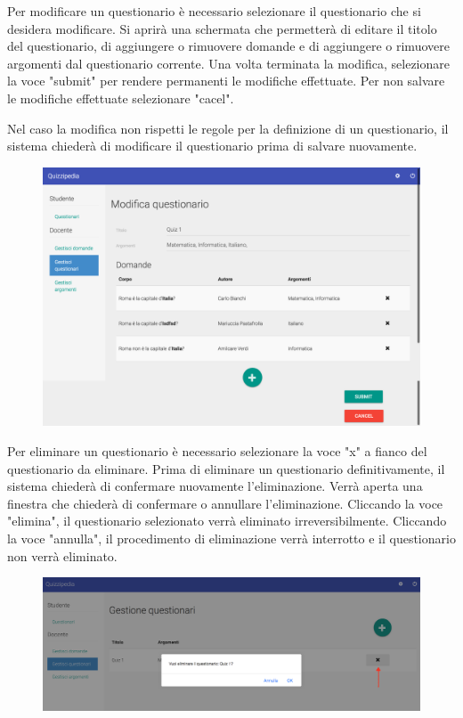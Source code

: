 \documentclass[12pt,a4paper]{article}
\begin{document}
		Per modificare un questionario è necessario selezionare il questionario che si desidera modificare. Si aprirà una schermata che permetterà di editare il titolo del questionario, di aggiungere o rimuovere domande e di aggiungere o rimuovere argomenti dal questionario corrente.
		Una volta terminata la modifica, selezionare la voce "submit" per rendere permanenti le modifiche effettuate. Per non salvare le modifiche effettuate selezionare "cacel".
			
		Nel caso la modifica non rispetti le regole per la definizione di un questionario, il sistema chiederà di modificare il questionario prima di salvare nuovamente.
		
		\begin{figure}[H]	
			\centering
			\includegraphics[width=1.0\linewidth]{../img/screenshot/modificaQuestionario.png}
			\caption{}
			\label{Modifica Questionario}
		\end{figure}
			
		Per eliminare un questionario è necessario selezionare la voce "x" a fianco del questionario da eliminare. Prima di eliminare un questionario definitivamente, il sistema chiederà di confermare nuovamente l'eliminazione.
		Verrà aperta una finestra che chiederà di confermare o annullare l'eliminazione. Cliccando la voce "elimina", il questionario selezionato verrà eliminato irreversibilmente. Cliccando la voce "annulla", il procedimento di eliminazione verrà interrotto e il questionario non verrà eliminato.
		
		\begin{figure}[H]	
			\centering
			\includegraphics[width=0.8\linewidth]{../img/screenshot/eliminaQuestionario.png}
			\caption{}
			\label{Elimina questionario}
		\end{figure}
		
\end{document}
